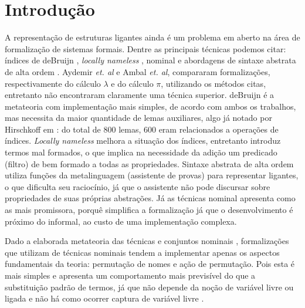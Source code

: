 \chapter{Introdução}\label{chp:intro}

A representação de estruturas ligantes ainda é um problema em aberto na área de formalização de sistemas formais. Dentre as principais técnicas podemos citar: índices de deBruijn \cite{Bruijn1972}, \textit{locally nameless} \cite{Chargueraud2011}, nominal \cite{Gabbay2002} e abordagens de sintaxe abstrata de alta ordem \cite{Pfenning1988,Harper1993}. Aydemir \textit{et. al} \cite{Aydemir2007} e Ambal \cite{Ambal2020} \textit{et. al}, compararam formalizações, respectivamente do cálculo $\lambda$ e do cálculo $\pi$, utilizando os métodos citas, entretanto não encontraram claramente uma técnica superior. deBruijn é a metateoria com implementação mais simples, de acordo com ambos os trabalhos, mas necessita da maior quantidade de lemas auxiliares, algo já notado por Hirschkoff em \cite{Hirschkoff1997}: do total de 800 lemas, 600 eram relacionados a operações de índices. \textit{Locally nameless} melhora a situação dos índices, entretanto introduz termos mal formados, o que implica na necessidade da adição um predicado (filtro) de bem formado a todas as propriedades. Sintaxe abstrata de alta ordem utiliza funções da metalinguagem (assistente de provas) para representar ligantes, o que dificulta seu raciocínio, já que o assistente não pode discursar sobre propriedades de suas próprias abstrações. Já as técnicas nominal
apresenta como as mais promissora, porquê simplifica a formalização já que o desenvolvimento é próximo do informal, ao custo de uma implementação complexa.

Dado a elaborada metateoria das técnicas e conjuntos nominais \cite{Pitts2006,Pitts2013}, formalizações que utilizam de técnicas nominais \cite{Aydemir2007, Urban2008, Copello2016, Copello2018, Ambal2020} tendem a implementar apenas os aspectos fundamentais da teoria: permutação de nomes e ação de permutação. Pois esta é mais simples e apresenta um comportamento mais previsível do que a substituição padrão de termos, já que não depende da noção de variável livre ou ligada e não há como ocorrer captura de variável livre \cite{Choudhury2015}.

